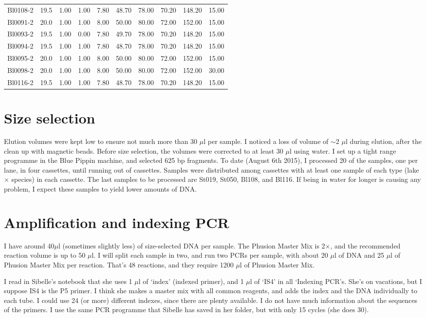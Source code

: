 \documentclass[a4paper,12pt,twosided]{article}
\begin{document}
\begin{table}
{\begin{center}
\begin{tabular}{lrrrrrrrrr}
Bl0108-2&19.5&1.00&1.00&7.80&48.70&78.00&70.20&148.20&15.00\\
Bl0091-2&20.0&1.00&1.00&8.00&50.00&80.00&72.00&152.00&15.00\\
Bl0093-2&19.5&1.00&0.00&7.80&49.70&78.00&70.20&148.20&15.00\\
Bl0094-2&19.5&1.00&1.00&7.80&48.70&78.00&70.20&148.20&15.00\\
Bl0095-2&20.0&1.00&1.00&8.00&50.00&80.00&72.00&152.00&15.00\\
Bl0098-2&20.0&1.00&1.00&8.00&50.00&80.00&72.00&152.00&30.00\\
Bl0116-2&19.5&1.00&1.00&7.80&48.70&78.00&70.20&148.20&15.00\\
\bottomrule
\end{tabular}
\end{center}}
\end{table}

\section{Size selection}
Elution volumes were kept low to ensure not much more than 30 $\mu$l per sample. I noticed a loss of volume of $\sim$2 $\mu$l during elution, after the clean up with magnetic beads. Before size selection, the volumes were corrected to at least 30 $\mu$l using water. I set up a tight range programme in the Blue Pippin machine, and selected 625 bp fragments. To date (August 6th 2015), I processed 20 of the samples, one per lane, in four cassettes, until running out of cassettes. Samples were distributed among cassettes with at least one sample of each type (lake $\times$ species) in each cassette. The last samples to be processed are St019, St050, Bl108, and Bl116. If being in water for longer is causing any problem, I expect these samples to yield lower amounts of DNA.

\section{Amplification and indexing PCR}
I have around 40$\mu$l (sometimes slightly less) of size-selected DNA per sample. The Phusion Master Mix is 2$\times$, and the recommended reaction volume is up to 50 $\mu$l. I will split each sample in two, and run two PCRs per sample, with about 20 $\mu$l of DNA and 25 $\mu$l of Phusion Master Mix per reaction. That's 48 reactions, and they require 1200 $\mu$l of Phusion Master Mix.

I read in Sibelle's notebook that she uses 1 $\mu$l of `index' (indexed primer), and 1 $\mu$l of `IS4' in all `Indexing PCR's. She's on vacations, but I suppose IS4 is the P5 primer. I think she makes a master mix with all common reagents, and adds the index and the DNA individually to each tube. I could use 24 (or more) different indexes, since there are plenty available. I do not have much information about the sequences of the primers. I use the same PCR programme that Sibelle has saved in her folder, but with only 15 cycles (she does 30).
\end{document}
